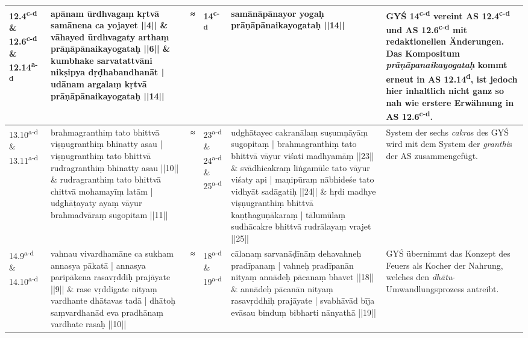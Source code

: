 \documentclass[a4paper,12pt]{article}
\begin{document}
{\begin{tabularx}{\textwidth}{p{}|p{}|p{}|p{}|p{}|p{}}
\hline
12.4\textsuperscript{c-d} \& 12.6\textsuperscript{c-d} \& 12.14\textsuperscript{a-d} & apānam ūrdhvagaṃ kṛtvā samānena ca yojayet ||4|| \newline \& \newline vāhayed ūrdhvagaty arthaṃ prāṇāpānaikayogataḥ ||6|| \newline \& \newline kumbhake sarvatattvāni nikṣipya dṛḍhabandhanāt | udānam argalaṃ kṛtvā prāṇāpānaikayogataḥ ||14|| & ≈ & 14\textsuperscript{c-d} & samānāpānayor yogaḥ prāṇāpānaikayogataḥ ||14|| & GYŚ 14\textsuperscript{c-d} vereint AS 12.4\textsuperscript{c-d} und AS 12.6\textsuperscript{c-d} mit redaktionellen Änderungen. Das Kompositum \textit{prāṇāpanaikayogataḥ} kommt erneut in AS 12.14\textsuperscript{d}, ist jedoch hier inhaltlich nicht ganz so nah wie erstere Erwähnung in AS 12.6\textsuperscript{c-d}. \\

\hline
13.10\textsuperscript{a-d} \& 13.11\textsuperscript{a-d} & brahmagranthiṃ tato bhittvā viṣṇugranthiṃ bhinatty asau | viṣṇugranthiṃ tato bhittvā rudragranthiṃ bhinatty asau ||10|| \newline \& \newline rudragranthiṃ tato bhittvā chittvā mohamayīṃ latām | udghāṭayaty ayaṃ vāyur brahmadvāraṃ sugopitam ||11|| & ≈ & 23\textsuperscript{a-d} \& 24\textsuperscript{a-d} \& 25\textsuperscript{a-d} & udghātayec cakranālaṃ suṣumṇāyāṃ sugopitaṃ | brahmagranthiṃ tato bhittvā vāyur viśati madhyamāṃ ||23|| \newline \& \newline
svādhicakraṃ liṅgamūle tato vāyur viśaty api | maṇipūraṃ nābhideśe tato vidhyāt sadāgatiḥ ||24|| \newline \& \newline
hṛdi madhye viṣṇugranthiṃ bhittvā kaṇṭhaguṇākaraṃ | tālumūlaṃ sudhācakre bhittvā rudrālayaṃ vrajet ||25|| & System der sechs \textit{cakra}s des GYŚ wird mit dem System der \textit{granthi}s der AS zusammengefügt. \\ 

\hline
14.9\textsuperscript{a-d} \& 14.10\textsuperscript{a-d} & vahnau vivardhamāne ca sukham annasya pākatā | annasya paripākena rasavṛddiḥ prajāyate ||9|| \newline \& \newline rase vṛddigate nityaṃ vardhante dhātavas tadā | dhātoḥ saṃvardhanād eva pradhānaṃ vardhate rasaḥ ||10|| & ≈ & 18\textsuperscript{a-d} \& 19\textsuperscript{a-d} & cālanaṃ sarvanāḍīnāṃ dehavahneḥ pradīpanaṃ | vahneḥ pradīpanān nityaṃ annādeḥ pācanaṃ bhavet ||18|| \newline \& \newline annādeḥ pācanān nityaṃ rasavṛddhiḥ prajāyate | svabhāvād bīja evāsau binduṃ bibharti nānyathā ||19|| & GYŚ übernimmt das Konzept des Feuers als Kocher der Nahrung, welches den \textit{dhātu}-Umwandlungsprozess antreibt. \\


\end{tabularx}}
\end{document}
